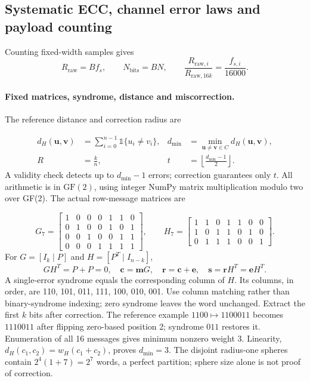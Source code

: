 \subsection{Systematic ECC, channel error laws and payload counting}
\label{app:ecc}
Counting fixed-width samples gives
\begin{equation}
 R_{\mathrm{raw}}=Bf_s,\qquad N_{\mathrm{bits}}=BN,\qquad
 \frac{R_{\mathrm{raw},i}}{R_{\mathrm{raw},16k}}=\frac{f_{s,i}}{16000}.
 \label{eq:sampling-payload}
\end{equation}

\paragraph{Fixed matrices, syndrome, distance and miscorrection.}
The reference distance and correction radius are

\begin{align}
 d_H(\mathbf u,\mathbf v)&=\sum_{i=0}^{n-1}
       \mathbb{1}\{u_i\ne v_i\},&
 d_{\min}&=\min_{\mathbf u\ne\mathbf v\in C}d_H(\mathbf u,\mathbf v),
 \label{eq:r32-distance}\\
 R&=\frac{k}{n},&
 t&=\left\lfloor\frac{d_{\min}-1}{2}\right\rfloor.
 \label{eq:r32-rate}
\end{align}
A validity check detects up to $d_{\min}-1$ errors; correction guarantees
only $t$. All arithmetic is in $\mathrm{GF}(2)$, using integer NumPy
matrix multiplication modulo two over GF(2). The actual row-message matrices are

\begin{equation}
 G_7=\left[\begin{array}{rrrr|rrr}
 1&0&0&0&1&1&0\\0&1&0&0&1&0&1\\
 0&0&1&0&0&1&1\\0&0&0&1&1&1&1
 \end{array}\right],\qquad
 H_7=\left[\begin{array}{rrrr|rrr}
 1&1&0&1&1&0&0\\1&0&1&1&0&1&0\\0&1&1&1&0&0&1
 \end{array}\right].
 \label{eq:r32-matrices}
\end{equation}
For $G=[I_k\mid P]$ and $H=[P^T\mid I_{n-k}]$,
\begin{equation}
 GH^T=P+P=0,\quad \mathbf c=\mathbf mG,\quad
 \mathbf r=\mathbf c+\mathbf e,\quad
 \mathbf s=\mathbf rH^T=\mathbf eH^T.
 \label{eq:r32-syndrome}
\end{equation}
A single-error syndrome equals the corresponding column of $H$.
Its columns, in order, are 110, 101, 011, 111, 100, 010, 001.
Use column matching rather than binary-syndrome indexing;
zero syndrome leaves the word unchanged. Extract the first $k$ bits
after correction.
The reference example $1100\mapsto1100011$ becomes $1110011$ after flipping
zero-based position 2; syndrome $011$ restores it. Enumeration of all 16
messages gives minimum nonzero weight 3. Linearity,
$d_H(c_1,c_2)=w_H(c_1+c_2)$, proves $d_{\min}=3$.
The disjoint radius-one spheres contain $2^4(1+7)=2^7$ words, a perfect
partition; sphere size alone is not proof of correction.

